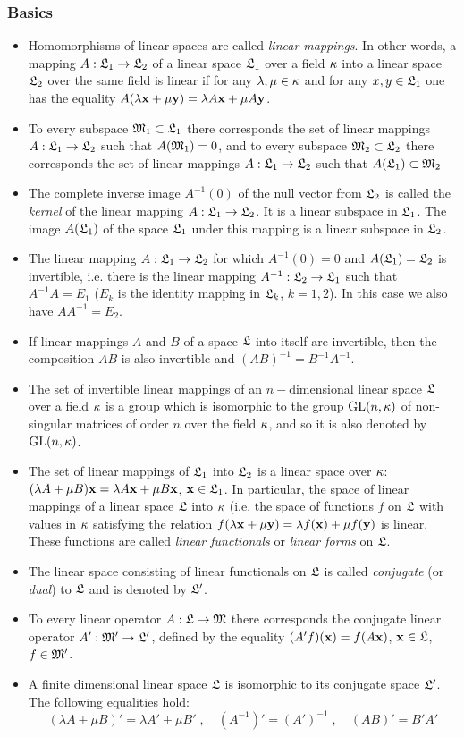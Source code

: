 \subsubsection{Basics}
\begin{itemize}
	\item Homomorphisms of linear spaces are called \emph{linear mappings}. In other words, a mapping $A:\mathfrak{L}_1\to \mathfrak{L}_2$ of a linear space $\mathfrak{L}_1$ over a field $\kappa$ into a linear space $\mathfrak{L}_2$ over the same field is linear if for any $\lambda,\mu\in\kappa$ and for any $x,y\in\mathfrak{L}_1$ one has the equality $A(\lambda \mathbf{x}+\mu \mathbf{y})=\lambda A\mathbf{x}+\mu A\mathbf{y}$.
	\item To every subspace $\mathfrak{M}_1\subset\mathfrak{L}_1$ there corresponds the set of linear mappings $A:\mathfrak{L}_1\to \mathfrak{L}_2$ such that $A(\mathfrak{M}_1) = 0$, and to every subspace $\mathfrak{M}_2\subset\mathfrak{L}_2$ there corresponds the set of linear mappings $A:\mathfrak{L}_1\to \mathfrak{L}_2$ such that $A(\mathfrak{L}_1)\subset\mathfrak{M}_2$ 
	\item The complete inverse image $A^{-1}(0)$ of the null vector from $\mathfrak{L}_2$ is called the \emph{kernel} of the linear mapping $A:\mathfrak{L}_1\to \mathfrak{L}_2$. It is a linear subspace in $\mathfrak{L}_1$. The image $A(\mathfrak{L}_1)$ of the space $\mathfrak{L}_1$ under this mapping is a linear subspace in $\mathfrak{L}_2$.
	\item The linear mapping $A: \mathfrak{L}_1\to\mathfrak{L}_2$ for which $A^{-1}(0) = 0$ and $A(\mathfrak{L}_1) = \mathfrak{L}_2$ is invertible, i.e. there is the linear mapping $A^{-1}: \mathfrak{L}_2\to\mathfrak{L}_1$ such that
	$A^{-1}A = E_1$ ($E_k$ is the identity mapping in $\mathfrak{L}_k$, $k = 1,2$). In this case we also have $AA^{-1}= E_2$.
	\item If linear mappings $A$ and $B$ of a space $\mathfrak{L}$ into itself are invertible, then
	the composition $AB$ is also invertible and $(AB)^{-1} = B^{-1}A^{-1}$.
	\item The set of invertible linear mappings of an $n-$dimensional linear space $\mathfrak{L}$ over a field $\kappa$ is a group which is isomorphic to the group $\mathrm{GL}(n, \kappa)$ of non-singular matrices of order $n$ over the field $\kappa$, and so it is also denoted by $\mathrm{GL}(n, \kappa)$.
	\item The set of linear mappings of $\mathfrak{L}_1$ into $\mathfrak{L}_2$ is a linear space over $\kappa$: $(\lambda A+\mu B)\mathbf{x}=\lambda A\mathbf{x}+\mu B\mathbf{x}$, $\mathbf{x}\in\mathfrak{L}_1$. In particular, the space of linear mappings of a linear space $\mathfrak{L}$ into $\kappa$
	(i.e. the space of functions $f$ on $\mathfrak{L}$ with values in $\kappa$ satisfying the relation
	$f(\lambda \mathbf{x}+\mu\mathbf{y}) = \lambda f(\mathbf{x})+\mu f(\mathbf{y})$ is linear. These functions are called \emph{linear functionals} or \emph{linear forms} on $\mathfrak{L}$.
	\item The linear space consisting of linear functionals on $\mathfrak{L}$ is called \emph{conjugate} (or \emph{dual}) to $\mathfrak{L}$ and is denoted by $\mathfrak{L}'$.
	\item To every linear operator $A:\mathfrak{L}\to\mathfrak{M}$ there corresponds the conjugate linear operator $A':\mathfrak{M}'\to\mathfrak{L}'$, defined by the equality $(A'f)(\mathbf{x})=f(A\mathbf{x})$, $\mathbf{x}\in\mathfrak{L}$, $f\in\mathfrak{M}'$.
	\item A finite dimensional linear space $\mathfrak{L}$ is isomorphic to its conjugate space $\mathfrak{L}'$. The following equalities hold: 
	$$(\lambda A+\mu B)'=\lambda A'+\mu B'\;,\quad (A^{-1})'=(A')^{-1}\;,\quad (AB)'=B'A'$$
\end{itemize}

